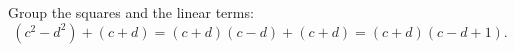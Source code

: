Group the squares and the linear terms:
\[
(c^2-d^2)+(c+d)=(c+d)(c-d)+(c+d)=\boxed{(c+d)(c-d+1)}.
\]

